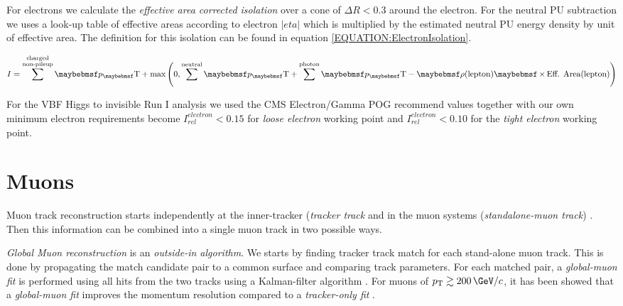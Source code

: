 
For electrons we calculate the \textit{effective area corrected isolation} over a cone of $\Delta R<0.3$ around the electron. For the neutral \gls{PU} subtraction we uses a look-up table of effective areas according to electron $|eta|$ which is multiplied by the estimated neutral \gls{PU} energy density by unit of effective area. The definition for this isolation can be found in equation \ref{EQUATION:ElectronIsolation}.

\begin{equation}
I = \sum^{\substack{\text{charged} \\ \text{non-pileup}}}\pT +
\text{max}\left(0,\sum^{\text{neutral}}\pT+\sum^{\text{photon}}\pT - \rho(\text{lepton}) \times \text{Eff. Area}(\text{lepton})\right)
\label{EQUATION:ElectronIsolation}
\end{equation}

For the \gls{VBF} Higgs to invisible Run I analysis we used the \gls{CMS} Electron/Gamma \gls{POG} recommend values together with our own minimum electron \pt requirements become $I_{rel}^{electron}<0.15$ for \textit{loose electron} working point and $I_{rel}^{electron}<0.10$ for the \textit{tight electron} working point.

\section{Muons}
\label{SECTION:EventReconstructionAndSimulation_Muons}


Muon track reconstruction starts independently at the inner-tracker (\textit{tracker track} and in the muon systems (\textit{standalone-muon track}) \cite{ARTICLE:CMSMuonReconstruction7TeV}. Then this information can be combined into a single muon track in two possible ways.

\textit{Global Muon reconstruction} is an \textit{outside-in algorithm}. We starts by finding tracker track match for each stand-alone muon track. This is done by propagating the match candidate pair to a common surface and comparing track parameters. For each matched pair, a \textit{global-muon fit} is performed using all hits from the two tracks using a Kalman-filter algorithm \cite{ARTICLE:KalmanFilteringTrackVertexFitting}. For muons of $\pt\gtrsim 200\,\GeV/c$, it has been showed that a \textit{global-muon fit} improves the momentum resolution compared to a \textit{tracker-only fit} \cite{CMSTDR:CMSPhysicsVol1, ARTICLE:CMSPerformanceMuonReconstructionCosmicRay}.

